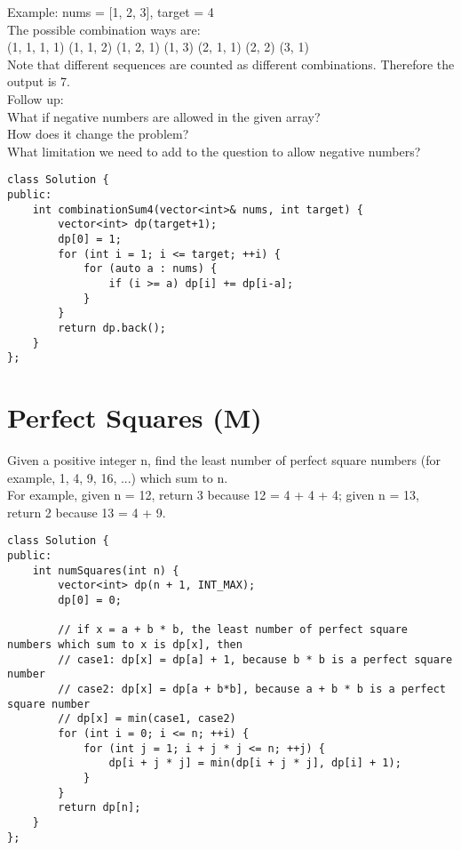 Example: nums = [1, 2, 3], target = 4\\
The possible combination ways are:\\
(1, 1, 1, 1)
(1, 1, 2)
(1, 2, 1)
(1, 3)
(2, 1, 1)
(2, 2)
(3, 1)\\

Note that different sequences are counted as different combinations. Therefore the output is 7.\\

Follow up:\\
What if negative numbers are allowed in the given array?\\
How does it change the problem?\\
What limitation we need to add to the question to allow negative numbers? \\

\begin{lstlisting}
class Solution {
public:
    int combinationSum4(vector<int>& nums, int target) {
        vector<int> dp(target+1);
        dp[0] = 1;
        for (int i = 1; i <= target; ++i) {
            for (auto a : nums) {
                if (i >= a) dp[i] += dp[i-a];
            }
        }
        return dp.back();
    }
};
\end{lstlisting}


\section{Perfect Squares (M)}
Given a positive integer n, find the least number of perfect square numbers (for example, 1, 4, 9, 16, ...) which sum to n.\\

For example, given n = 12, return 3 because 12 = 4 + 4 + 4; given n = 13, return 2 because 13 = 4 + 9. \\

\begin{lstlisting}
class Solution {
public:
    int numSquares(int n) {
        vector<int> dp(n + 1, INT_MAX);
        dp[0] = 0;
        
        // if x = a + b * b, the least number of perfect square numbers which sum to x is dp[x], then
        // case1: dp[x] = dp[a] + 1, because b * b is a perfect square number
        // case2: dp[x] = dp[a + b*b], because a + b * b is a perfect square number
        // dp[x] = min(case1, case2)
        for (int i = 0; i <= n; ++i) {
            for (int j = 1; i + j * j <= n; ++j) {
                dp[i + j * j] = min(dp[i + j * j], dp[i] + 1);
            }
        }
        return dp[n];
    }
};
\end{lstlisting}


